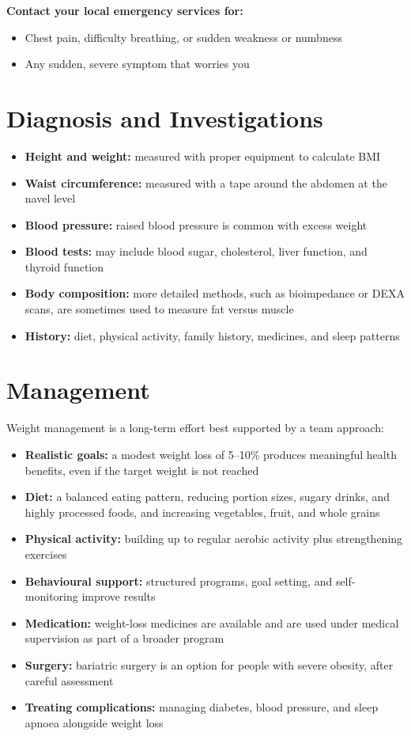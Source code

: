 \textbf{Contact your local emergency services for:}
\begin{itemize}
    \item Chest pain, difficulty breathing, or sudden weakness or numbness
    \item Any sudden, severe symptom that worries you
\end{itemize}

\section*{Diagnosis and Investigations}
\begin{itemize}
    \item \textbf{Height and weight:} measured with proper equipment to calculate BMI
    \item \textbf{Waist circumference:} measured with a tape around the abdomen at the navel level
    \item \textbf{Blood pressure:} raised blood pressure is common with excess weight
    \item \textbf{Blood tests:} may include blood sugar, cholesterol, liver function, and thyroid function
    \item \textbf{Body composition:} more detailed methods, such as bioimpedance or DEXA scans, are sometimes used to measure fat versus muscle
    \item \textbf{History:} diet, physical activity, family history, medicines, and sleep patterns
\end{itemize}

\section*{Management}
Weight management is a long-term effort best supported by a team approach:

\begin{itemize}
    \item \textbf{Realistic goals:} a modest weight loss of 5--10\% produces meaningful health benefits, even if the target weight is not reached
    \item \textbf{Diet:} a balanced eating pattern, reducing portion sizes, sugary drinks, and highly processed foods, and increasing vegetables, fruit, and whole grains
    \item \textbf{Physical activity:} building up to regular aerobic activity plus strengthening exercises
    \item \textbf{Behavioural support:} structured programs, goal setting, and self-monitoring improve results
    \item \textbf{Medication:} weight-loss medicines are available and are used under medical supervision as part of a broader program
    \item \textbf{Surgery:} bariatric surgery is an option for people with severe obesity, after careful assessment
    \item \textbf{Treating complications:} managing diabetes, blood pressure, and sleep apnoea alongside weight loss
\end{itemize}

